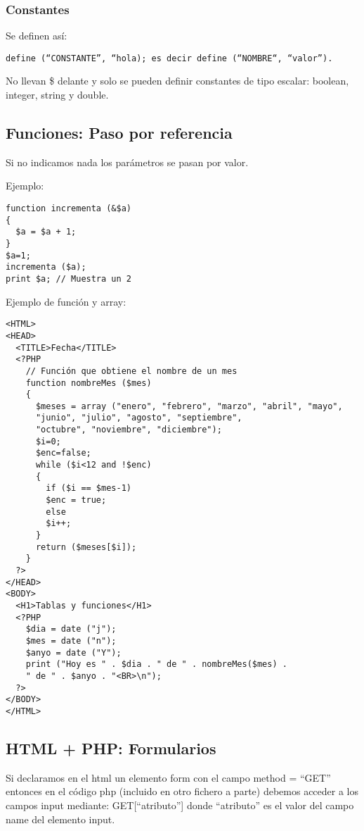 \documentclass{apuntes}
\begin{document}
\subsubsection{Constantes}
Se definen así:
\begin{verbatim}
define (“CONSTANTE”, “hola); es decir define (“NOMBRE“, “valor”).
\end{verbatim}
No llevan \$ delante y solo se pueden definir constantes de tipo escalar: boolean, integer, string y double.

\newpage
\subsection{Funciones: Paso por referencia}
Si no indicamos nada los parámetros se pasan por valor.

Ejemplo:
\begin{verbatim}
function incrementa (&$a)
{
  $a = $a + 1;
}
$a=1;
incrementa ($a);
print $a; // Muestra un 2
\end{verbatim}

Ejemplo de función y array:

\begin{verbatim}
<HTML>
<HEAD>
  <TITLE>Fecha</TITLE>
  <?PHP
    // Función que obtiene el nombre de un mes
    function nombreMes ($mes)
    {
      $meses = array ("enero", "febrero", "marzo", "abril", "mayo",
      "junio", "julio", "agosto", "septiembre",
      "octubre", "noviembre", "diciembre");
      $i=0;
      $enc=false;
      while ($i<12 and !$enc)
      {
        if ($i == $mes-1)
        $enc = true;
        else
        $i++;
      }
      return ($meses[$i]);
    }
  ?>
</HEAD>
<BODY>
  <H1>Tablas y funciones</H1>
  <?PHP
    $dia = date ("j");
    $mes = date ("n");
    $anyo = date ("Y");
    print ("Hoy es " . $dia . " de " . nombreMes($mes) .
    " de " . $anyo . "<BR>\n");
  ?>
</BODY>
</HTML>
\end{verbatim}

\subsection{HTML + PHP: Formularios}
Si declaramos en el html un elemento form con el campo method = “GET” entonces en el código php (incluido en otro fichero a parte) debemos acceder a los campos input mediante: GET[“atributo”] donde “atributo” es el valor del campo name del elemento input.
\end{document}
